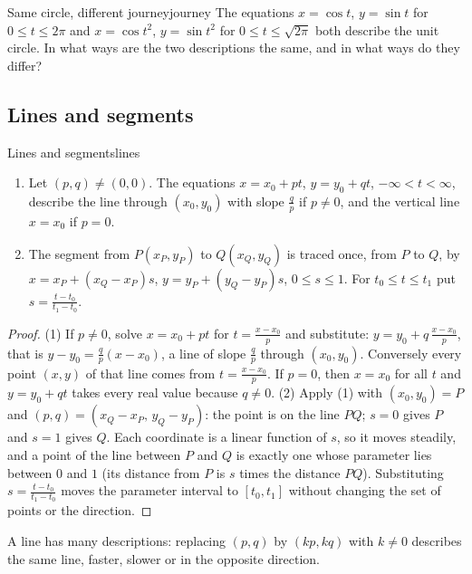 \documentclass[11pt]{article}
\begin{document}
\begin{think}{Same circle, different journey}{journey}
The equations $x=\cos t$, $y=\sin t$ for $0\le t\le2\pi$ and $x=\cos t^2$, $y=\sin t^2$ for $0\le t\le\sqrt{2\pi}$ both describe the unit circle. In what ways are the two descriptions the same, and in what ways do they differ?
\end{think}

\subsection*{Lines and segments}

\begin{thm}{Lines and segments}{lines}
\begin{enumerate}[nosep]
  \item Let $(p,q)\ne(0,0)$. The equations $x=x_0+pt$, $y=y_0+qt$, $-\infty<t<\infty$, describe the line through $(x_0,y_0)$ with slope $\frac qp$ if $p\ne0$, and the vertical line $x=x_0$ if $p=0$.
  \item The segment from $P(x_P,y_P)$ to $Q(x_Q,y_Q)$ is traced once, from $P$ to $Q$, by $x=x_P+(x_Q-x_P)s$, $y=y_P+(y_Q-y_P)s$, $0\le s\le1$. For $t_0\le t\le t_1$ put $s=\frac{t-t_0}{t_1-t_0}$.
\end{enumerate}
\end{thm}
\begin{proof}
(1) If $p\ne0$, solve $x=x_0+pt$ for $t=\frac{x-x_0}p$ and substitute: $y=y_0+q\,\frac{x-x_0}p$, that is $y-y_0=\frac qp(x-x_0)$, a line of slope $\frac qp$ through $(x_0,y_0)$. Conversely every point $(x,y)$ of that line comes from $t=\frac{x-x_0}p$. If $p=0$, then $x=x_0$ for all $t$ and $y=y_0+qt$ takes every real value because $q\ne0$.
(2) Apply (1) with $(x_0,y_0)=P$ and $(p,q)=(x_Q-x_P,\,y_Q-y_P)$: the point is on the line $PQ$; $s=0$ gives $P$ and $s=1$ gives $Q$. Each coordinate is a linear function of $s$, so it moves steadily, and a point of the line between $P$ and $Q$ is exactly one whose parameter lies between $0$ and $1$ (its distance from $P$ is $s$ times the distance $PQ$). Substituting $s=\frac{t-t_0}{t_1-t_0}$ moves the parameter interval to $[t_0,t_1]$ without changing the set of points or the direction.
\end{proof}

A line has many descriptions: replacing $(p,q)$ by $(kp,kq)$ with $k\ne0$ describes the same line, faster, slower or in the opposite direction.
\end{document}
